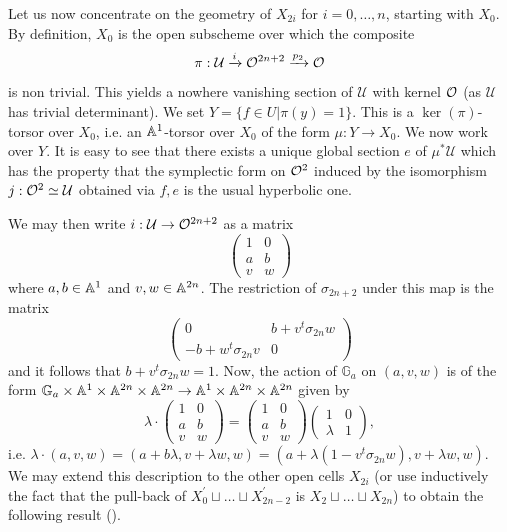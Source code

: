 \begin{num}
Let us now concentrate on the geometry of $X_{2i}$ for $i=0,\ldots,n$, starting with $X_0$. By definition, $X_0$ is the open subscheme over which the composite 
\[
\pi:\mathcal{U}\xrightarrow{i} \OO^{2n+2}\xrightarrow{p_2} \OO
\]
is non trivial. This yields a nowhere vanishing section of $\mathcal{U}$ with kernel $\OO$ (as $\mathcal U$ has trivial determinant). We set $Y=\{f\in U\vert \pi(y)=1\}$. This is a $\ker(\pi)$-torsor over $X_0$, i.e. an $\AA^1$-torsor over $X_0$ of the form $\mu:Y\to X_0$. We now work over $Y$. It is easy to see that there exists a unique global section $e$ of $\mu^*\mathcal{U}$ which has the property that the symplectic form on $\OO^2$ induced by the isomorphism $j:\OO^2\simeq \mathcal{U}$ obtained via $f,e$ is the usual hyperbolic one. 

We may then write $i:\mathcal{U}\to \OO^{2n+2}$ as a matrix
\[
\begin{pmatrix} 1 & 0 \\ a & b \\ v & w\end{pmatrix}
\]
where $a,b\in \AA^1$ and $v,w\in \AA^{2n}$. The restriction of $\sigma_{2n+2}$ under this map is the matrix
\[
\begin{pmatrix} 0 & b+v^t\sigma_{2n}w \\ -b+w^t\sigma_{2n}v & 0\end{pmatrix}
\]
and it follows that $b+v^t\sigma_{2n}w=1$. Now, the action of $\mathbb{G}_a$ on $(a,v,w)$ is of the form $\mathbb{G}_a\times \AA^1\times \AA^{2n}\times \AA^{2n}\to \AA^1\times \AA^{2n}\times \AA^{2n}$  given by 
\[
\lambda\cdot \begin{pmatrix} 1 & 0 \\ a & b \\ v & w\end{pmatrix}=\begin{pmatrix} 1 & 0 \\ a & b \\ v & w\end{pmatrix}\begin{pmatrix} 1 & 0 \\ \lambda & 1\end{pmatrix},
\]
i.e. $\lambda\cdot (a,v,w)=(a+b\lambda,v+\lambda w,w)=(a+\lambda(1-v^t\sigma_{2n}w),v+\lambda w,w)$. We may extend this description to the other open cells $X_{2i}$ (or use inductively the fact that the pull-back of $X^\prime_0\sqcup\ldots \sqcup X^\prime_{2n-2}$ is $X_2\sqcup\ldots \sqcup X_{2n}$) to obtain the following result (\cite[Theorem 3.4]{PWQuaternionic}).


\end{num}
